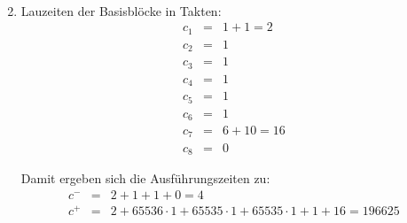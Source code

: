 \documentclass[DIN, pagenumber=false, fontsize=11pt, parskip=half]{scrartcl}
\begin{document}
\begin{enumerate}[label=\alph*)]
\begin{eqnarray}
            \end{eqnarray}
        \item 
            Lauzeiten der Basisblöcke in Takten:
            \begin{eqnarray}
                c_1 &=& 1 + 1 = 2 \\
                c_2 &=& 1 \\
                c_3 &=& 1 \\
                c_4 &=& 1 \\
                c_5 &=& 1 \\
                c_6 &=& 1 \\
                c_7 &=& 6 + 10 = 16\\
                c_8 &=& 0
            \end{eqnarray}
            
            Damit ergeben sich die Ausführungszeiten zu:
            \begin{eqnarray}
                c^- &=& 2 + 1 + 1 + 0 = 4 \\
                c^+ &=& 2 + 65536 \cdot 1 + 65535 \cdot 1 + 65535 \cdot 1 + 1 + 16
                        = 196625
            \end{eqnarray}
    \end{enumerate}
\end{document}
